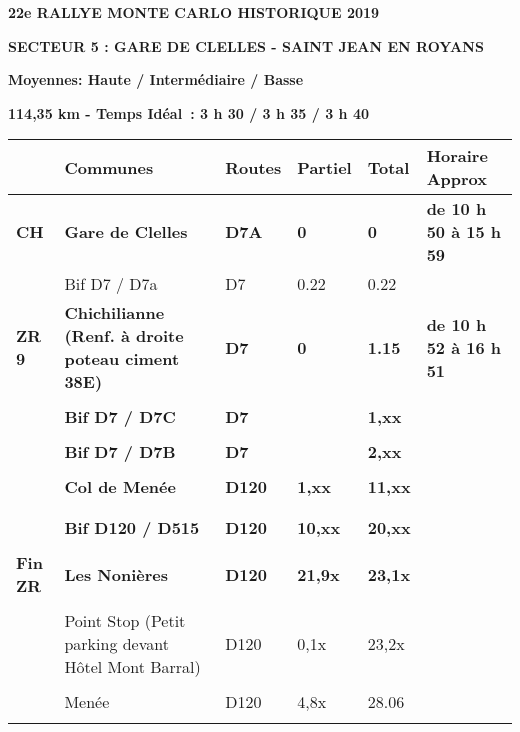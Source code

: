 \documentclass{article}%
\begin{document}
%
\normalsize%
\begin{center} \textbf{\LARGE{22e RALLYE MONTE CARLO HISTORIQUE 2019}} \end{center}%
\begin{flushleft} \textbf{SECTEUR 5 : GARE DE CLELLES - SAINT JEAN EN ROYANS 
} \end{flushleft}%
\begin{flushright} \textbf{             Moyennes: Haute / Intermédiaire / Basse
} \end{flushright}%
\begin{flushright} \textbf{114,35 km - Temps Idéal : 3 h 30 / 3 h 35 / 3 h 40
} \end{flushright}%
\begin{longtable}{p{2.25cm}|p{7.0cm}|p{1.5cm}|p{1.5cm}|p{1.5cm}|p{3.5cm}}%
\hline%
&Communes&Routes&Partiel&Total&Horaire Approx\\%
\hline%
\endhead%
\endfoot%
\endlastfoot%
\textbf{﻿CH}&\textbf{Gare de Clelles}&\textbf{D7A}&\textbf{0}&\textbf{0}&\textbf{de 10 h 50 à 15 h 59}\\%
 &Bif D7 / D7a&D7&0.22&0.22& \\%
\textbf{ ZR 9      }&\textbf{Chichilianne (Renf. à droite poteau ciment 38E)}&\textbf{D7}&\textbf{0}&\textbf{1.15}&\textbf{de 10 h 52 à 16 h 51}\\%
 & & & & & \\%
 &\textbf{Bif D7 / D7C}&\textbf{D7}& &\textbf{1,xx}& \\%
 & & & & & \\%
 &\textbf{Bif D7 / D7B}&\textbf{D7}& &\textbf{2,xx}& \\%
 & & & & & \\%
 &\textbf{Col de Menée }&\textbf{D120}&\textbf{1,xx}&\textbf{11,xx}& \\%
 & & & & & \\%
\hline& & & & & \\%
 &\textbf{Bif D120 / D515}&\textbf{D120}&\textbf{10,xx}&\textbf{20,xx}& \\%
 & & & & & \\%
\textbf{Fin ZR }&\textbf{Les Nonières }&\textbf{D120}&\textbf{21,9x}&\textbf{23,1x}& \\%
 & & & & & \\%
 &Point Stop (Petit parking devant Hôtel Mont Barral)&D120&0,1x&23,2x& \\%
 & & & & & \\%
 &Menée &D120&4,8x&28.06& \\%
 & & & & & \\%

\end{longtable}
\end{document}

